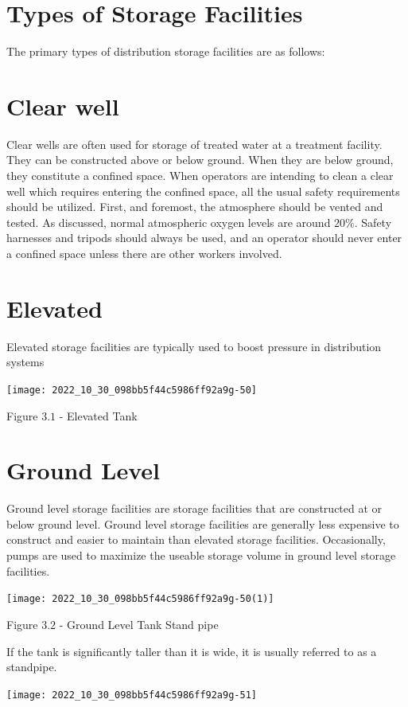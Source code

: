 \documentclass[10pt]{article}
\begin{document}
\section{Types of Storage Facilities}
The primary types of distribution storage facilities are as follows:

\section{Clear well}
Clear wells are often used for storage of treated water at a treatment facility. They can be constructed above or below ground. When they are below ground, they constitute a confined space. When operators are intending to clean a clear well which requires entering the confined space, all the usual safety requirements should be utilized. First, and foremost, the atmosphere should be vented and tested. As discussed, normal atmospheric oxygen levels are around $20 \%$. Safety harnesses and tripods should always be used, and an operator should never enter a confined space unless there are other workers involved.

\section{Elevated}
Elevated storage facilities are typically used to boost pressure in distribution systems

\texttt{[image: 2022\_10\_30\_098bb5f44c5986ff92a9g-50]}

Figure $3.1$ - Elevated Tank

\section{Ground Level}
Ground level storage facilities are storage facilities that are constructed at or below ground level. Ground level storage facilities are generally less expensive to construct and easier to maintain than elevated storage facilities. Occasionally, pumps are used to maximize the useable storage volume in ground level storage facilities.

\texttt{[image: 2022\_10\_30\_098bb5f44c5986ff92a9g-50(1)]}

Figure $3.2$ - Ground Level Tank Stand pipe

If the tank is significantly taller than it is wide, it is usually referred to as a standpipe.

\texttt{[image: 2022\_10\_30\_098bb5f44c5986ff92a9g-51]}
\end{document}
